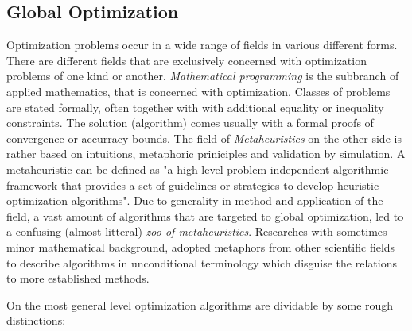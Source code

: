 \documentclass[english]{article}
\begin{document}
\subsection{Global Optimization}
Optimization problems occur in a wide range of fields in various different forms. There are different fields that are exclusively concerned with optimization problems of one kind or another. \textit{Mathematical programming} is the subbranch of applied mathematics, that is concerned with optimization. Classes of problems are stated formally, often together with with additional equality or inequality constraints. The solution (algorithm) comes usually with a formal proofs of convergence or accurracy bounds. The field of \textit{Metaheuristics}
on the other side is rather based on intuitions, metaphoric priniciples and validation by simulation. A metaheuristic can be defined as "a high-level problem-independent algorithmic framework that provides a set of guidelines or strategies to develop heuristic optimization algorithms". \cite{sorensen_history_2014} Due to generality in method and application of the field, a vast amount of algorithms that are targeted to global optimization, led to a confusing (almost litteral) \textit{zoo of metaheuristics}. Researches with sometimes minor mathematical background, adopted metaphors from other scientific fields to describe algorithms in unconditional terminology which disguise the relations to more established methods. \cite{sorensen_metaheuristics-metaphor_2015}


On the most general level optimization algorithms are dividable by some rough distinctions:
\end{document}
